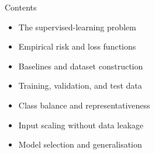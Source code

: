 \newcommand{\lecturetitle}{Basic Machine Learning I}
\newcommand{\lecturesubtitle}{Trusting the experiment}
\newcommand{\covertext}{Basic Machine\\Learning I}



\begin{frame}{Contents}
\begin{itemize}
  \item The supervised-learning problem
  \item Empirical risk and loss functions
  \item Baselines and dataset construction
  \item Training, validation, and test data
  \item Class balance and representativeness
  \item Input scaling without data leakage
  \item Model selection and generalisation
\end{itemize}
\end{frame}


